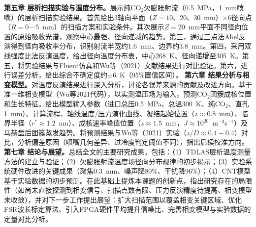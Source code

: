 	\textbf{第五章 层析扫描实验与温度分布。}展示纯CO$_2$欠膨胀射流（0.5~MPa，1~mm喷嘴）的层析扫描实验结果。首先给出3轴向平面（$Z=10$、20、30~mm）$\times$6径向点（$R=0$—5~mm）的扫描方案和实验条件。其次展示$Z=20$~mm平面不同径向位置的原始吸收光谱，观察中心最强、径向递减的趋势。第三，通过三点法Abel反演得到径向吸收率分布，识别射流半宽约1.6~mm、边界约3.8~mm。第四，采用双线强度比法反演温度，给出径向温度分布表，中心268~K、径向递增至305~K。第五，将实验结果与Fluent仿真和Wu等（2021）文献结果进行对比验证。第六，进行误差分析，给出综合不确定度约±6~K（95\%置信区间）。
	\textbf{第六章 结果分析与相变模型。}对温度反演结果进行深入分析，讨论各误差来源的贡献及改进方向。基于准一维相变模型（Wu等2021代码），以实测温压场为输入，预测CO$_2$团簇成核位置和生长特征。给出模型输入参数（进口总压0.5~MPa、总温300~K、纯CO$_2$、直孔1~mm）、计算流程、轴线温度/压力演化曲线、凝结起始位置（$z\approx0.8$~mm）、临界半径（$r^*\approx1.2$~nm）、成核速率峰值位置（$z\approx1.5$~mm，$J\approx10^{20}$~m$^{-3}$s$^{-1}$）及马赫盘后团簇蒸发趋势。将预测结果与Wu等（2021）实验（$z/D\approx0.1-0.4$）对比，分析偏差原因（喷嘴几何差异、过冷度判定阈值不同），指出后续校准方向。
	\textbf{第七章 结论与展望。}总结全文的主要研究成果，包括：（1）TDLAS层析温度测量方法的建立与验证；（2）欠膨胀射流温度场径向分布规律的初步揭示；（3）实验系统硬件改进的关键成果（聚焦0.3~mm、噪声降80\%、干扰降96\%）；（4）CNT模型基于实验数据的初步预测。在此基础上提炼本课题的创新点，指出研究存在的局限性（如尚未直接探测到相变信号、扫描点数有限、压力反演精度待提高、相变模型未收敛），并对下一步工作提出展望：扩大扫描范围以覆盖相变关键区域、优化FSR波长标定算法、引入FPGA硬件平均提升信噪比、完善相变模型与实验数据的定量对比分析。

